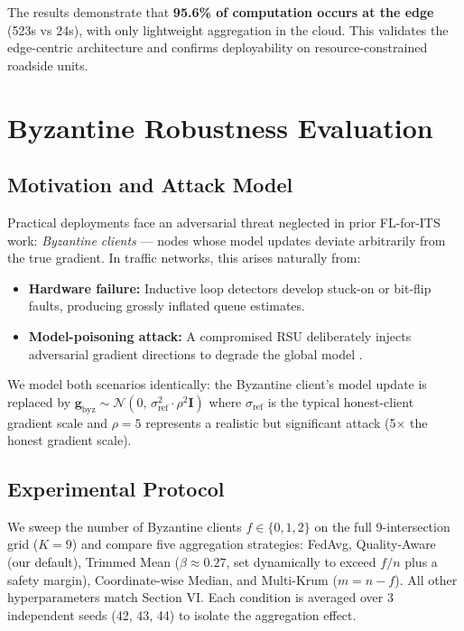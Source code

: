 \documentclass[conference]{IEEEtran}
\begin{document}
The results demonstrate that \textbf{95.6\% of computation occurs at the edge} (523s vs 24s), with only lightweight aggregation in the cloud. This validates the edge-centric architecture and confirms deployability on resource-constrained roadside units.

\section{Byzantine Robustness Evaluation}

\subsection{Motivation and Attack Model}
Practical deployments face an adversarial threat neglected in prior FL-for-ITS work: \emph{Byzantine clients} — nodes whose model updates deviate arbitrarily from the true gradient. In traffic networks, this arises naturally from:
\begin{itemize}
    \item \textbf{Hardware failure:} Inductive loop detectors develop stuck-on or bit-flip faults, producing grossly inflated queue estimates.
    \item \textbf{Model-poisoning attack:} A compromised RSU deliberately injects adversarial gradient directions to degrade the global model \cite{fang2020local}.
\end{itemize}
We model both scenarios identically: the Byzantine client's model update is replaced by $\mathbf{g}_\text{byz} \sim \mathcal{N}(0,\, \sigma_\text{ref}^2 \cdot \rho^2 \mathbf{I})$ where $\sigma_\text{ref}$ is the typical honest-client gradient scale and $\rho = 5$ represents a realistic but significant attack (5$\times$ the honest gradient scale).

\subsection{Experimental Protocol}
We sweep the number of Byzantine clients $f \in \{0, 1, 2\}$ on the full 9-intersection grid ($K=9$) and compare five aggregation strategies: FedAvg, Quality-Aware (our default), Trimmed Mean ($\beta \approx 0.27$, set dynamically to exceed $f/n$ plus a safety margin), Coordinate-wise Median, and Multi-Krum ($m = n - f$). All other hyperparameters match Section VI. Each condition is averaged over 3 independent seeds (42, 43, 44) to isolate the aggregation effect.
\end{document}
